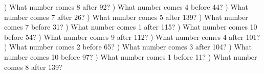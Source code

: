 \documentclass{article}%
\begin{document}
) What number comes 8 after 92?%
\newline%
\newline%
) What number comes 4 before 44?%
\newline%
\newline%
) What number comes 7 after 26?%
\newline%
\newline%
) What number comes 5 after 139?%
\newline%
\newline%
) What number comes 7 before 31?%
\newline%
\newline%
) What number comes 1 after 115?%
\newline%
\newline%
) What number comes 10 before 54?%
\newline%
\newline%
) What number comes 9 after 112?%
\newline%
\newline%
) What number comes 4 after 101?%
\newline%
\newline%
) What number comes 2 before 65?%
\newline%
\newline%
) What number comes 3 after 104?%
\newline%
\newline%
) What number comes 10 before 97?%
\newline%
\newline%
) What number comes 1 before 11?%
\newline%
\newline%
) What number comes 8 after 139?%
\newline%
\newline%
\newline%
\end{document}
